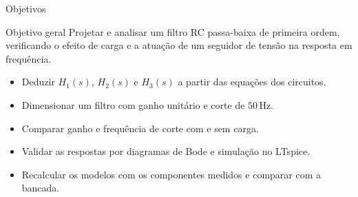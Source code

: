 \begin{frame}{Objetivos}
  \begin{block}{Objetivo geral}
    Projetar e analisar um filtro RC passa-baixa de primeira ordem, verificando
    o efeito de carga e a atuação de um seguidor de tensão na resposta em frequência.
  \end{block}

  \begin{itemize}
    \item Deduzir $H_1(s)$, $H_2(s)$ e $H_3(s)$ a partir das equações dos circuitos.
    \item Dimensionar um filtro com ganho unitário e corte de $50\,\mathrm{Hz}$.
    \item Comparar ganho e frequência de corte com e sem carga.
    \item Validar as respostas por diagramas de Bode e simulação no LTspice.
    \item Recalcular os modelos com os componentes medidos e comparar com a bancada.
  \end{itemize}
\end{frame}
